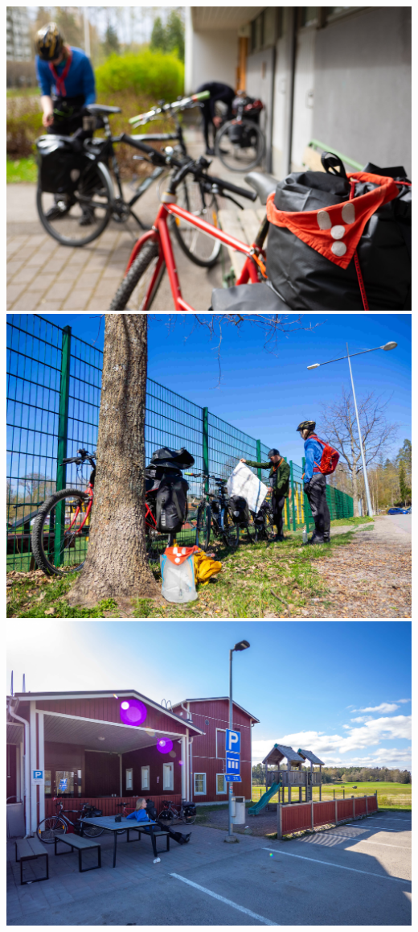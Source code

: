 \documentclass[10pt,finnish,a5paper,twoside=semi]{scrartcl}
\begin{document}
\begin{multicols}{2}


	\begin{center}
		\noindent\includegraphics[width=0.94\linewidth]{assets/pyörävaellus1}
		\noindent\includegraphics[width=0.94\linewidth]{assets/pyörävaellus3}
		\noindent\includegraphics[width=0.94\linewidth]{assets/pyörävaellus4}

\end{center}
\end{multicols}
\end{document}
